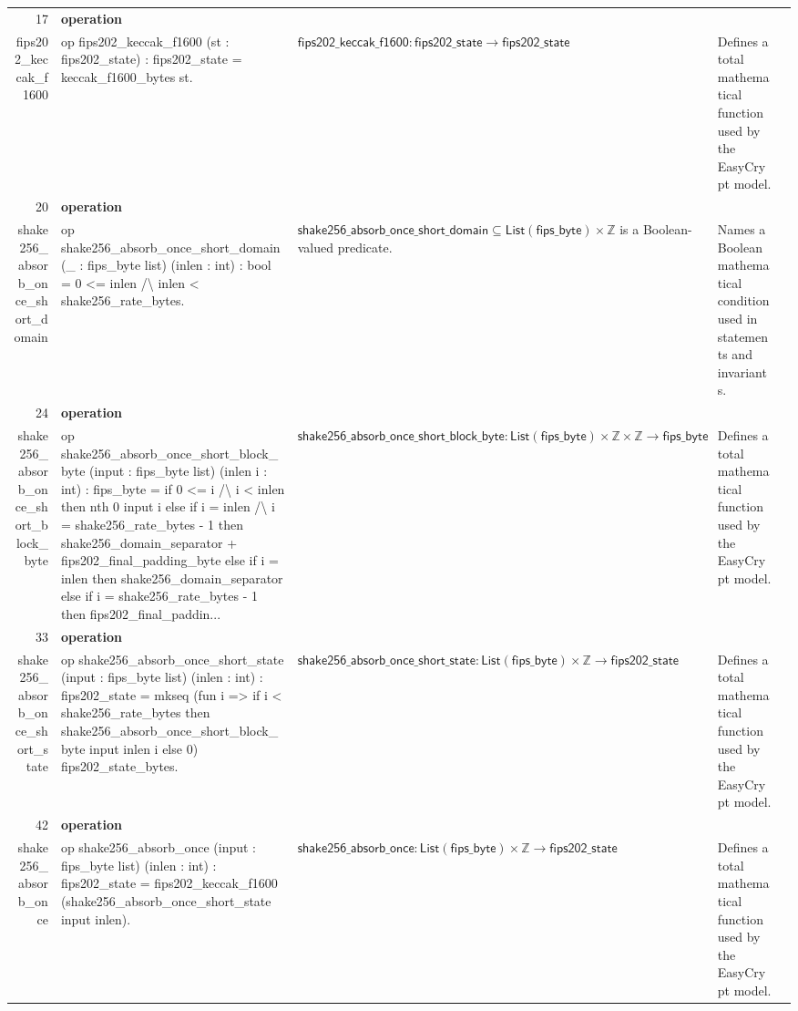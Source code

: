\documentclass[10pt]{article}
\newcommand{\ec}[1]{\begingroup\ttfamily\scriptsize #1\endgroup}
\begin{document}
\begin{longtable}{r L{0.17\textwidth} L{0.26\textwidth} L{0.27\textwidth} L{0.20\textwidth}}
17 & \textbf{operation}\\\ec{fips202\_keccak\_f1600} & \ec{op fips202\_keccak\_f1600 (st : fips202\_state) : fips202\_state = keccak\_f1600\_bytes st.} & \(\mathsf{fips202\_keccak\_f1600} : \mathsf{fips202\_state} \to \mathsf{fips202\_state}\) & Defines a total mathematical function used by the EasyCrypt model. \\
20 & \textbf{operation}\\\ec{shake256\_absorb\_once\_short\_domain} & \ec{op shake256\_absorb\_once\_short\_domain (\_ : fips\_byte list) (inlen : int) : bool = 0 <= inlen /\textbackslash{} inlen < shake256\_rate\_bytes.} & \(\mathsf{shake256\_absorb\_once\_short\_domain} \subseteq \mathsf{List}(\mathsf{fips\_byte}) \times \mathbb{Z}\) is a Boolean-valued predicate. & Names a Boolean mathematical condition used in statements and invariants. \\
24 & \textbf{operation}\\\ec{shake256\_absorb\_once\_short\_block\_byte} & \ec{op shake256\_absorb\_once\_short\_block\_byte (input : fips\_byte list) (inlen i : int) : fips\_byte = if 0 <= i /\textbackslash{} i < inlen then nth 0 input i else if i = inlen /\textbackslash{} i = shake256\_rate\_bytes - 1 then shake256\_domain\_separator + fips202\_final\_padding\_byte else if i = inlen then shake256\_domain\_separator else if i = shake256\_rate\_bytes - 1 then fips202\_final\_paddin...} & \(\mathsf{shake256\_absorb\_once\_short\_block\_byte} : \mathsf{List}(\mathsf{fips\_byte}) \times \mathbb{Z} \times \mathbb{Z} \to \mathsf{fips\_byte}\) & Defines a total mathematical function used by the EasyCrypt model. \\
33 & \textbf{operation}\\\ec{shake256\_absorb\_once\_short\_state} & \ec{op shake256\_absorb\_once\_short\_state (input : fips\_byte list) (inlen : int) : fips202\_state = mkseq (fun i => if i < shake256\_rate\_bytes then shake256\_absorb\_once\_short\_block\_byte input inlen i else 0) fips202\_state\_bytes.} & \(\mathsf{shake256\_absorb\_once\_short\_state} : \mathsf{List}(\mathsf{fips\_byte}) \times \mathbb{Z} \to \mathsf{fips202\_state}\) & Defines a total mathematical function used by the EasyCrypt model. \\
42 & \textbf{operation}\\\ec{shake256\_absorb\_once} & \ec{op shake256\_absorb\_once (input : fips\_byte list) (inlen : int) : fips202\_state = fips202\_keccak\_f1600 (shake256\_absorb\_once\_short\_state input inlen).} & \(\mathsf{shake256\_absorb\_once} : \mathsf{List}(\mathsf{fips\_byte}) \times \mathbb{Z} \to \mathsf{fips202\_state}\) & Defines a total mathematical function used by the EasyCrypt model. \\

\end{longtable}
\end{document}
